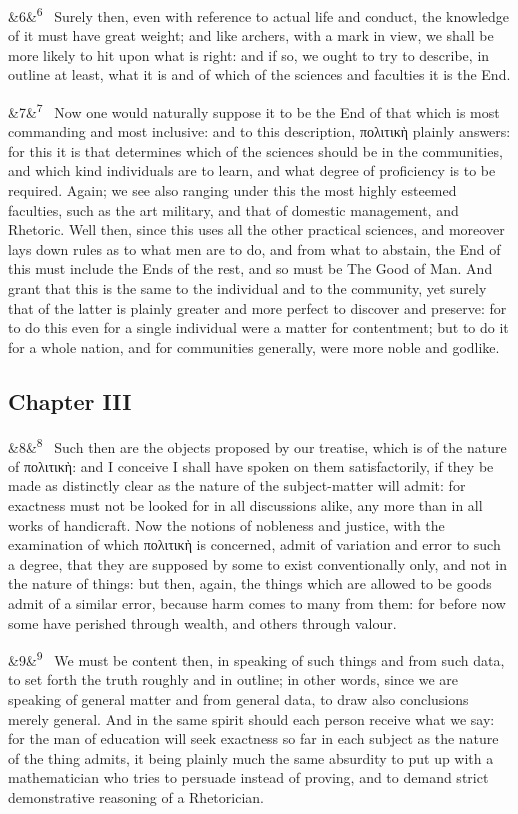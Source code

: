 \documentclass[12pt]{article}
\newcommand{\para}[1][]{\par\noindent\ifx&#1&\else\textsuperscript{\footnotesize #1}~\fi}
\begin{document}
\para[6] Surely then, even with reference to actual life and conduct, the knowledge of it must have great weight; and like archers, with a mark in view, we shall be more likely to hit upon what is right: and if so, we ought to try to describe, in outline at least, what it is and of which of the sciences and faculties it is the End.

\para[7] Now one would naturally suppose it to be the End of that which is most commanding and most inclusive: and to this description, πολιτικὴ plainly answers: for this it is that determines which of the sciences should be in the communities, and which kind individuals are to learn, and what degree of proficiency is to be required. Again; we see also ranging under this the most highly esteemed faculties, such as the art military, and that of domestic management, and Rhetoric. Well then, since this uses all the other practical sciences, and moreover lays down rules as to what men are to do, and from what to abstain, the End of this must include the Ends of the rest, and so must be The Good of Man. And grant that this is the same to the individual and to the community, yet surely that of the latter is plainly greater and more perfect to discover and preserve: for to do this even for a single individual were a matter for contentment; but to do it for a whole nation, and for communities generally, were more noble and godlike.

\subsection*{Chapter III}

\para[8] Such then are the objects proposed by our treatise, which is of the nature of πολιτικὴ: and I conceive I shall have spoken on them satisfactorily, if they be made as distinctly clear as the nature of the subject-matter will admit: for exactness must not be looked for in all discussions alike, any more than in all works of handicraft. Now the notions of nobleness and justice, with the examination of which πολιτικὴ is concerned, admit of variation and error to such a degree, that they are supposed by some to exist conventionally only, and not in the nature of things: but then, again, the things which are allowed to be goods admit of a similar error, because harm comes to many from them: for before now some have perished through wealth, and others through valour.

\para[9] We must be content then, in speaking of such things and from such data, to set forth the truth roughly and in outline; in other words, since we are speaking of general matter and from general data, to draw also conclusions merely general. And in the same spirit should each person receive what we say: for the man of education will seek exactness so far in each subject as the nature of the thing admits, it being plainly much the same absurdity to put up with a mathematician who tries to persuade instead of proving, and to demand strict demonstrative reasoning of a Rhetorician.
\end{document}
